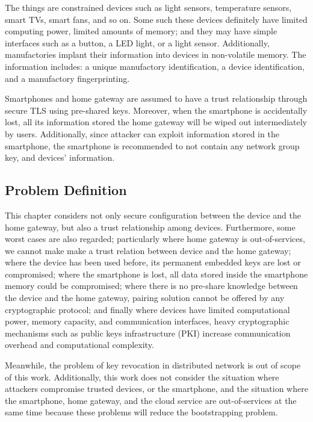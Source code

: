 The things are constrained devices such as light sensors, temperature sensors, smart TVs, smart fans, and so on. Some such these devices definitely have limited computing power, limited amounts of memory; and they may have simple interfaces such as a button, a LED light, or a light sensor. Additionally, manufactories implant their information into devices in non-volatile memory. The information includes: a unique manufactory identification, a device identification, and a manufactory fingerprinting.

Smartphones and home gateway are assumed to have a trust relationship through secure TLS using pre-shared keys. Moreover, when the smartphone is accidentally lost, all its information stored the home gateway will be wiped out intermediately by users. Additionally, since attacker can exploit information stored in the smartphone, the smartphone is recommended to not contain any network group key, and devices' information. 

\subsection{Problem Definition}

This chapter considers not only secure configuration between the device and the home gateway, but also a trust relationship among devices. Furthermore, some worst cases are also regarded; particularly where home gateway is out-of-services, we cannot make make a trust relation between device and the home gateway; where the device has been used before, its permanent embedded keys are lost or compromised; where the smartphone is lost, all data stored inside the smartphone memory could be compromised; where there is no pre-share knowledge between the device and the home gateway, pairing solution cannot be offered by any cryptographic protocol; and finally where devices have limited computational power, memory capacity, and communication interfaces, heavy cryptographic mechanisms such as public keys infrastructure (PKI) increase communication overhead and computational complexity.  

Meanwhile, the problem of key revocation in distributed network is out of scope of this work. Additionally, this work does not consider the situation where attackers compromise trusted devices, or the smartphone, and the situation where the smartphone, home gateway, and the cloud service are out-of-services at the same time because these problems will reduce the bootstrapping problem. 

